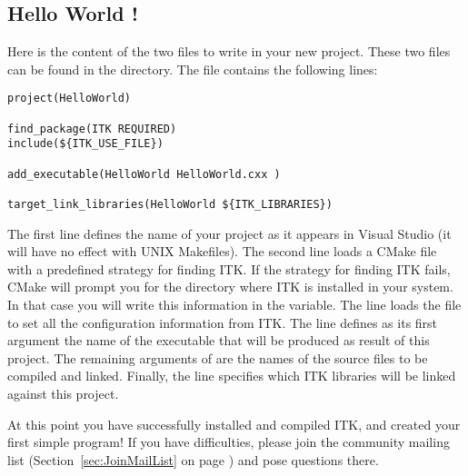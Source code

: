 \subsection{Hello World !}
\label{sec:HelloWorldITK}


Here is the content of the two files to write in your new project. These two
files can be found in the  directory. The
 file contains the following lines:

\begin{verbatim}
project(HelloWorld)

find_package(ITK REQUIRED)
include(${ITK_USE_FILE})

add_executable(HelloWorld HelloWorld.cxx )

target_link_libraries(HelloWorld ${ITK_LIBRARIES})
\end{verbatim}

The first line defines the name of your project as it appears in Visual
Studio (it will have no effect with UNIX Makefiles). The second line loads a CMake
file with a predefined strategy for finding ITK. If the strategy for finding ITK fails, CMake will prompt
you for the directory where ITK is installed in your system. In that case you
will write this information in the  variable. The line
 loads the  file to set
all the configuration information from ITK. The line 
defines as its first argument the name of the executable that will be produced
as result of this project. The remaining arguments of 
are the names of the source files to be compiled and linked.  Finally, the
 line specifies which ITK libraries will be
linked against this project.




At this point you have successfully installed and compiled ITK, and created
your first simple program! If you have difficulties, please join the
community mailing list (Section~\ref{sec:JoinMailList} on page
\pageref{sec:JoinMailList}) and pose questions there.
